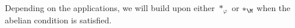 
Depending on the applications, we will build upon either $\ast_{\varphi}$ or $\ast_{\M}$ when the abelian condition is satisfied.
